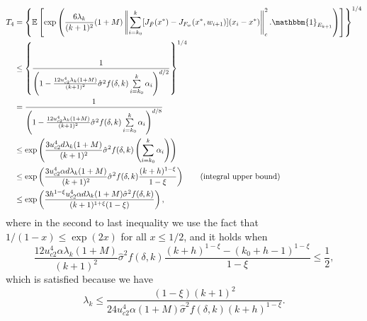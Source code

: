 \documentclass[letterpaper, 10 pt]{article}
\newcommand{\E}{\mathbb{E}}
\begin{document}
\begin{align*}
    T_4&=\left\{\E\left[\exp\left( \frac{6\lambda_k}{(k+1)^2} (1+M) \left\|\sum\limits_{i=k_0}^{k} [J_{\bar{F}}(x^*)-J_{F_w}(x^*,w_{i+1})](x_i-x^*) \right\|^2_c.\mathbbm{1}_{E_{k+1}}\right)\right]\right\}^{1/4} \\
    &\leq \left\{\frac{1}{\left(1-\frac{12u_{c2}^4\lambda_k(1+M)}{(k+1)^2}\hat{\sigma}^2f(\delta,k)\sum\limits_{i=k_0}^k\alpha_i\right)^{d/2}}\right\}^{1/4}\\
    &=\frac{1}{\left(1-\frac{12u_{c2}^4\lambda_k(1+M)}{(k+1)^2}\hat{\sigma}^2f(\delta,k)\sum\limits_{i=k_0}^k\alpha_i\right)^{d/8}}\\
    &\leq \exp\left(\frac{3u_{c2}^4d\lambda_k(1+M)}{(k+1)^2}\hat{\sigma}^2f(\delta,k)\left(\sum\limits_{i=k_0}^k\alpha_i\right) \right)\\
    &\leq \exp\left(\frac{3u_{c2}^4\alpha d\lambda_k(1+M)}{(k+1)^2}\hat{\sigma}^2f(\delta,k)\frac{(k+h)^{1-\xi}}{1-\xi} \right) \tag{integral upper bound}\\
    &\leq \exp\left(\frac{3h^{1-\xi}u_{c2}^4\alpha d\lambda_k(1+M)\hat{\sigma}^2f(\delta,k)}{(k+1)^{1+\xi}(1-\xi)}\right),
\end{align*}
where in the second to last inequality we use the fact that $1/(1-x)\leq \exp(2x)$ for all $x\leq 1/2$, and it holds when
\[ \frac{12u_{c2}^4\alpha \lambda_k(1+M)}{(k+1)^2}\hat{\sigma}^2f(\delta,k)\frac{ (k+h)^{1-\xi}-(k_0+h-1)^{1-\xi}}{1-\xi} \leq \frac{1}{2}, \]
which is satisfied because we have
\[ 
\lambda_k \leq \frac{(1-\xi)(k+1)^2}{24 u_{c2}^4\alpha (1+M)\hat{\sigma}^2f(\delta,k)(k+h)^{1-\xi}}.
\]
\end{document}
